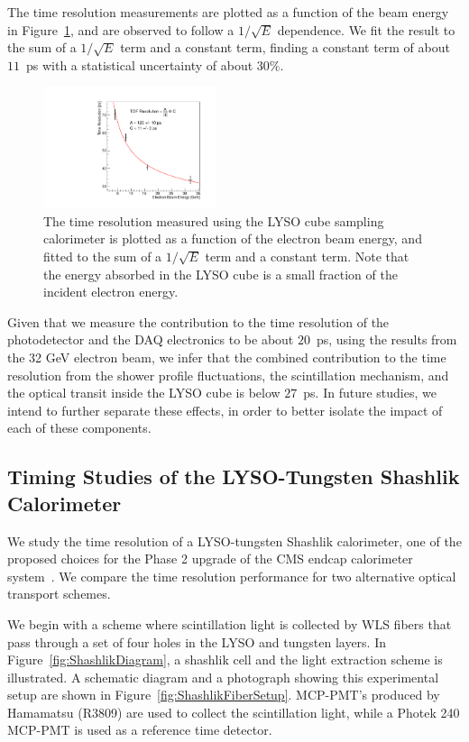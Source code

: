 \documentclass[12pt]{article}
\begin{document}
{The time resolution measurements are plotted as a function of the
beam energy in Figure~\ref{fig:LYSOCubeTOFResolutionVsEnergy}, and are observed
to follow a $1/\sqrt{E}$ dependence. We fit the result to the sum of a 
$1/\sqrt{E}$ term and a constant term, finding a constant term of
about $11$~ps with a statistical uncertainty of about $30\%$. 

\begin{figure}[h] \centering
\includegraphics[width=0.45\textwidth]{figs/TimeResolutionVsEnergy_CrystalCube} 
\caption{ The time resolution measured using the LYSO cube
sampling calorimeter is plotted as a function of the electron beam energy, 
and fitted to the sum of a $1/\sqrt{E}$ term and a constant term. Note that the energy absorbed in the LYSO cube is a small fraction of the incident electron energy.}
\label{fig:LYSOCubeTOFResolutionVsEnergy}
\end{figure}

Given that we measure the contribution to the time resolution of the
photodetector and the DAQ electronics to be about $20$~ps, using the results from
the 32 GeV electron beam, we infer that the
combined contribution to the time resolution from the shower profile
fluctuations, the scintillation mechanism, and the optical transit inside the
LYSO cube is below $27$~ps. In future studies, we intend to further separate these
effects, in order to better isolate the impact of each of these components.

\subsection{Timing Studies of the LYSO-Tungsten Shashlik Calorimeter}

We study the time resolution of a LYSO-tungsten Shashlik calorimeter, one of the
proposed choices for the Phase 2 upgrade of the CMS endcap calorimeter
system~\cite{Contardo:1605208}. We compare the time resolution performance for
two alternative optical transport schemes. 

We begin with a scheme where scintillation light is collected by WLS fibers that
pass through a set of four holes in the LYSO and tungsten layers. In 
Figure~\ref{fig:ShashlikDiagram}, a shashlik cell and the light extraction 
scheme is illustrated. A schematic diagram and a photograph showing this experimental
setup are shown in Figure~\ref{fig:ShashlikFiberSetup}. MCP-PMT's produced by 
Hamamatsu (R3809) are used to collect the scintillation light, while a Photek 240 
MCP-PMT is used as a reference time detector. 

}
\end{document}
